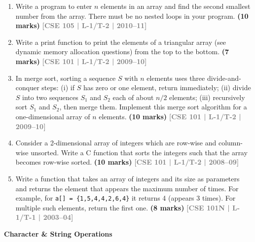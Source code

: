 \documentclass[12pt,a3paper]{article}
\newcommand{\yr}[1]{\hfill\textcolor{gray}{\small\textbf{[#1]}}}
\newcommand{\mk}[1]{\textcolor{orange!70!black}{\small\textbf{(#1 marks)}}}
\newcommand{\subtopic}[2]{%
  \vspace{10pt}
  \noindent\begin{tcolorbox}[colback=#1!8,colframe=#1,boxrule=0.6pt,arc=4pt,
    left=6pt,right=6pt,top=4pt,bottom=4pt]
    \small\bfseries\textcolor{#1}{#2}
  \end{tcolorbox}
  \vspace{2pt}
}
\begin{document}
\begin{enumerate}
\item Write a program to enter $n$ elements in an array and find the second smallest number from the array. There must be no nested loops in your program.
\mk{10} \yr{CSE 105 | L-1/T-2 | 2010--11}

\item Write a print function to print the elements of a triangular array (see dynamic memory allocation questions) from the top to the bottom.
\mk{7} \yr{CSE 101 | L-1/T-2 | 2009--10}

\item In merge sort, sorting a sequence $S$ with $n$ elements uses three divide-and-conquer steps: (i) if $S$ has zero or one element, return immediately; (ii) divide $S$ into two sequences $S_1$ and $S_2$ each of about $n/2$ elements; (iii) recursively sort $S_1$ and $S_2$, then merge them. Implement this merge sort algorithm for a one-dimensional array of $n$ elements.
\mk{10} \yr{CSE 101 | L-1/T-2 | 2009--10}

\item Consider a 2-dimensional array of integers which are row-wise and column-wise unsorted. Write a C function that sorts the integers such that the array becomes row-wise sorted.
\mk{10} \yr{CSE 101 | L-1/T-2 | 2008--09}

\item Write a function that takes an array of integers and its size as parameters and returns the element that appears the maximum number of times. For example, for \texttt{a[] = \{1,5,4,4,2,6,4\}} it returns 4 (appears 3 times). For multiple such elements, return the first one.
\mk{8} \yr{CSE 101N | L-1/T-1 | 2003--04}

\end{enumerate}

\subtopic{cB}{Character \& String Operations}
\label{sub:s4-strings}
\end{document}
